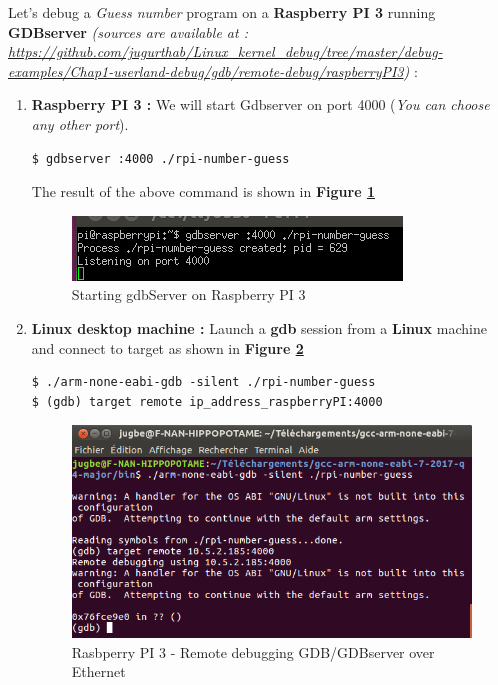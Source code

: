 	


Let's debug a \og \emph{Guess number} \fg program on a \textbf{Raspberry PI 3} running \textbf{GDBserver} \emph{(sources are available at : {\color{blue} \url{https://github.com/jugurthab/Linux_kernel_debug/tree/master/debug-examples/Chap1-userland-debug/gdb/remote-debug/raspberryPI3}})} : 
\begin{enumerate}
	\item \textbf{Raspberry PI 3 : } We will start Gdbserver on port 4000 (\emph{You can choose any other port}).
	\begin{lstlisting}[style=BashInputStyle]
$ gdbserver :4000 ./rpi-number-guess
    \end{lstlisting}

The result of the above command is shown in \textbf{Figure \ref{Starting gdbServer on Raspberry PI 3}}
\begin{figure}[H]
		\centering
        \includegraphics[scale=0.45]{img/solution/starting-ethernet-gdbserver-session-rp3.png}
        \caption{Starting gdbServer on Raspberry PI 3}
        \label{Starting gdbServer on Raspberry PI 3}
    \end{figure}



	\item \textbf{Linux desktop machine :} Launch a \textbf{gdb} session from a \textbf{Linux} machine and connect to target as shown in \textbf{Figure \ref{Rasbperry PI 3 - Remote debugging GDB/GDBserver over Ethernet}}
		\begin{lstlisting}[style=BashInputStyle]
$ ./arm-none-eabi-gdb -silent ./rpi-number-guess
$ (gdb) target remote ip_address_raspberryPI:4000	
    \end{lstlisting}
	
\begin{figure}[H]
		\centering
        \includegraphics[scale=0.33]{img/solution/gdb-server-ethernet.png}
        \caption{Rasbperry PI 3 - Remote debugging GDB/GDBserver over Ethernet}
        \label{Rasbperry PI 3 - Remote debugging GDB/GDBserver over Ethernet}
    \end{figure}	
	

\end{enumerate}
